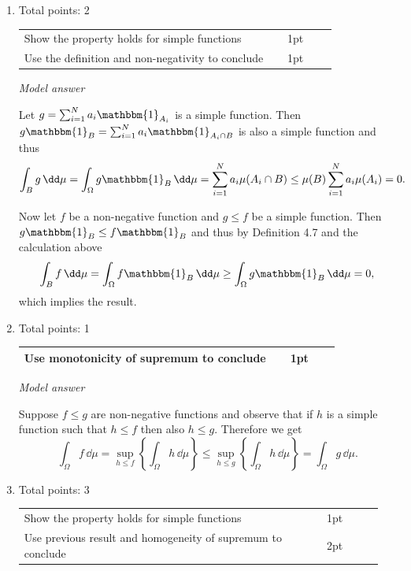 \documentclass{lecturenotes}
\begin{document}
\begin{enumerate}[label={(\alph*)}]
\item Total points: 2 \hfill

\begin{tabular}{p{0.8\linewidth}p{0.15\linewidth}}
\hline
Show the property holds for simple functions & 1pt\\
Use the definition and non-negativity to conclude & 1pt\\
\hline
\end{tabular}

\textit{Model answer}

Let $g = \sum_{i = 1}^N a_i \mathbbm{1}_{A_i}$ is a simple function. Then $g \mathbbm{1}_B = \sum_{i = 1}^N a_i \mathbbm{1}_{A_i \cap B}$ is also a simple function and thus
\[
	\int_B g \, \dd \mu = \int_\Omega g \mathbbm{1}_B \, \dd \mu = \sum_{i = 1}^N a_i \mu(A_i \cap B) \le \mu(B) \sum_{i = 1}^N a_i \mu(A_i) = 0.
\]

Now let $f$ be a non-negative function and $g \le f$ be a simple function. Then $g \mathbbm{1}_B \le f \mathbbm{1}_B$ and thus by Definition 4.7 and the calculation above
\begin{align*}
	\int_B f \, \dd \mu = \int_\Omega f \mathbbm{1}_B \, \dd \mu \ge \int_\Omega g \mathbbm{1}_B \, \dd \mu = 0,
\end{align*}
which implies the result.

\item Total points: 1\hfill

\begin{tabular}{p{0.8\linewidth}p{0.15\linewidth}}
\hline
Use monotonicity of supremum to conclude & 1pt\\
\hline
\end{tabular}

\textit{Model answer}

Suppose $f \le g$ are non-negative functions and observe that if $h$ is a simple function such that $h \le f$ then also $h \le g$. Therefore we get
\[
	\int_\Omega f \, \dd \mu = \sup_{h \le f}\left\{\int_\Omega h \, \dd \mu\right\}
	\le \sup_{h \le g}\left\{\int_\Omega h \, \dd \mu\right\} = \int_\Omega g \, \dd \mu.
\]


\item Total points: 3\hfill

\begin{tabular}{p{0.8\linewidth}p{0.15\linewidth}}
\hline
Show the property holds for simple functions & 1pt\\
Use previous result and homogeneity of supremum to conclude & 2pt\\
\hline
\end{tabular}


\end{enumerate}
\end{document}
